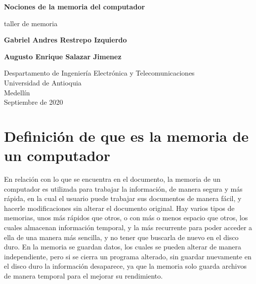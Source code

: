 \documentclass{article}
\begin{document}
\begin{titlepage}
    \begin{center}
        \vspace*{1cm}
            
        \Huge
        \textbf{Nociones de la memoria del computador}
            
        \vspace{0.5cm}
        \LARGE
        taller de memoria
            
        \vspace{1.5cm}
            
        \textbf{Gabriel Andres Restrepo Izquierdo}
        
        \vspace{1,5cm}

        \textbf{Augusto Enrique Salazar Jimenez}
        \vfill
            
        \vspace{0.8cm}
            
        \Large
        Despartamento de Ingeniería Electrónica y Telecomunicaciones\\
        Universidad de Antioquia\\
        Medellín\\
        Septiembre de 2020
            
    \end{center}
\end{titlepage}

\tableofcontents

\newpage

\section{Definición de que es la memoria de un computador}
En relación con lo que se encuentra en el documento, la memoria de un computador es utilizada para trabajar la información, de manera segura y más rápida, en la cual el usuario puede trabajar sus documentos de manera fácil, y hacerle modificaciones sin alterar el documento original.
        \vspace{0.5cm}
Hay varios tipos de memorias, unos más rápidos que otros, o con más o menos espacio que otros, los cuales almacenan información temporal, y la más recurrente para poder acceder a ella de una manera más sencilla, y no tener que buscarla de nuevo en el disco duro.
        \vspace{0.5cm}
En la memoria se guardan datos, los cuales se pueden alterar de manera independiente, pero si se cierra un programa alterado, sin guardar nuevamente en el disco duro la información desaparece, ya que la memoria solo guarda archivos de manera temporal para el mejorar su rendimiento.  
\end{document}
